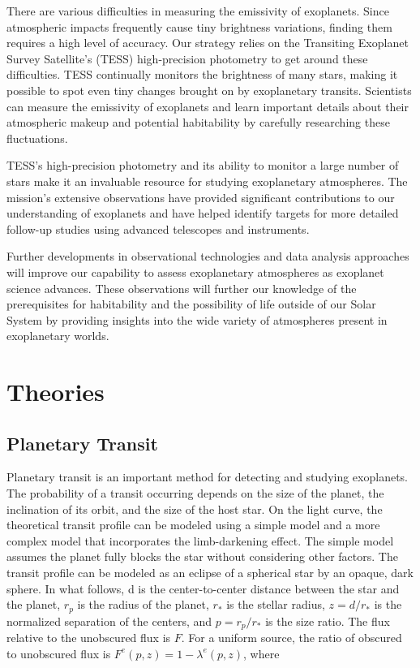 \documentclass{article}
\begin{document}
There are various difficulties in measuring the emissivity of exoplanets. Since atmospheric impacts frequently cause tiny brightness variations, finding them requires a high level of accuracy. Our strategy relies on the Transiting Exoplanet Survey Satellite's (TESS) high-precision photometry to get around these difficulties. TESS continually monitors the brightness of many stars, making it possible to spot even tiny changes brought on by exoplanetary transits. Scientists can measure the emissivity of exoplanets and learn important details about their atmospheric makeup and potential habitability by carefully researching these fluctuations.

TESS's high-precision photometry and its ability to monitor a large number of stars make it an invaluable resource for studying exoplanetary atmospheres. The mission's extensive observations have provided significant contributions to our understanding of exoplanets and have helped identify targets for more detailed follow-up studies using advanced telescopes and instruments.

Further developments in observational technologies and data analysis approaches will improve our capability to assess exoplanetary atmospheres as exoplanet science advances. These observations will further our knowledge of the prerequisites for habitability and the possibility of life outside of our Solar System by providing insights into the wide variety of atmospheres present in exoplanetary worlds.

\section{Theories}

\subsection{Planetary Transit}

Planetary transit is an important method for detecting and studying exoplanets. The probability of a transit occurring depends on the size of the planet, the inclination of its orbit, and the size of the host star. On the light curve, the theoretical transit profile can be modeled using a simple model and a more complex model that incorporates the limb-darkening effect. The simple model assumes the planet fully blocks the star without considering other factors. The transit profile can be modeled as an eclipse of a spherical star by an opaque, dark sphere. In what follows, d is the center-to-center distance between the star and the planet, $r_{p}$ is the radius of the planet, $r_{*}$ is the stellar radius, $z = d/r_{*}$ is the normalized separation of the centers, and $p = r_{p}/r_{*}$ is the size ratio. The flux relative to the unobscured flux is $F$. For a uniform source, the ratio of obscured to unobscured flux is $F^{e}(p,z) = 1- \lambda^{e}(p,z)$, where
\end{document}
